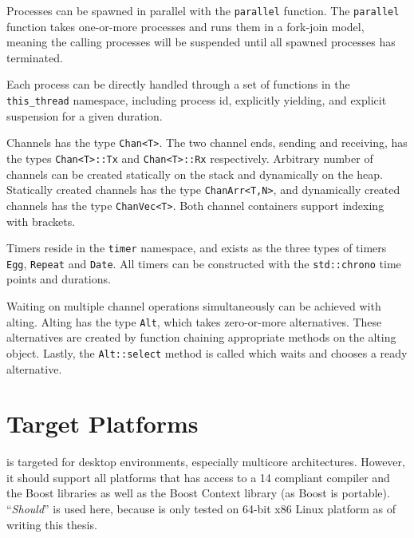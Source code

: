 Processes can be spawned in parallel with the \lstinline[style={CustomC++}]|parallel| function. The \lstinline[style={CustomC++}]|parallel| function takes one\hyp{}or\hyp{}more processes and runs them in a fork\hyp{}join model, meaning the calling processes will be suspended until all spawned processes has terminated.

Each process can be directly handled through a set of functions in the \lstinline[style={CustomC++}]|this_thread| namespace, including process id, explicitly yielding, and explicit suspension for a given duration.

Channels has the type \lstinline[style={CustomC++}]|Chan<T>|. The two channel ends, sending and receiving, has the types \lstinline[style={CustomC++}]|Chan<T>::Tx| and \lstinline[style={CustomC++}]|Chan<T>::Rx| respectively. Arbitrary number of channels can be created statically on the stack and dynamically on the heap. Statically created channels has the type \lstinline[style={CustomC++}]|ChanArr<T,N>|, and dynamically created channels has the type \lstinline[style={CustomC++}]|ChanVec<T>|. Both channel containers support indexing with brackets.

Timers reside in the \lstinline[style={CustomC++}]|timer| namespace, and exists as the three types of timers \lstinline[style={CustomC++}]|Egg|, \lstinline[style={CustomC++}]|Repeat| and \lstinline[style={CustomC++}]|Date|. All timers can be constructed with the \lstinline[style={CustomC++}]|std::chrono| time points and durations.

Waiting on multiple channel operations simultaneously can be achieved with alting. Alting has the type \lstinline[style={CustomC++}]|Alt|, which takes zero\hyp{}or\hyp{}more alternatives. These alternatives are created by function chaining appropriate methods on the alting object. Lastly, the \lstinline[style={CustomC++}]|Alt::select| method is called which waits and chooses a ready alternative.


\section{Target Platforms}
\label{sec:target_platforms}


\Proxc{} is targeted for desktop environments, especially multicore architectures. However, it should support all platforms that has access to a \Cpp{}14 compliant compiler and the Boost \Cpp{} libraries \citep{boost2017boost} as well as the Boost Context library \citep{kowalke2017boost} (as Boost is portable). ``\textit{Should}'' is used here, because \Proxc{} is only tested on 64\hyp{}bit x86 Linux platform as of writing this thesis.


